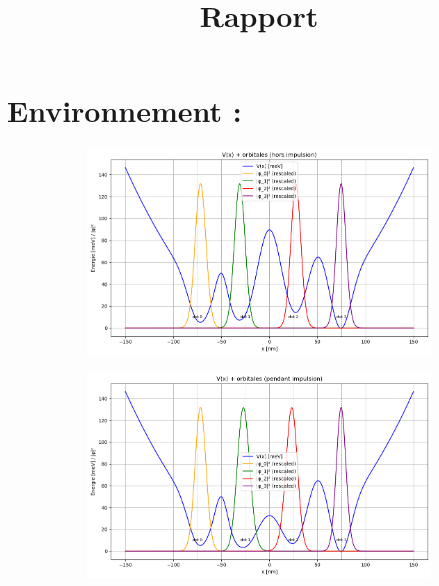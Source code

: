 \documentclass{article}
\title{Rapport}
\begin{document}
\maketitle

\section*{Environnement :}

\begin{figure}[H]
  \centering
  \begin{subfigure}[c]{0.48\textwidth}
    \centering
    \includegraphics[width=\textwidth]{hors_impulsion_bon.png}
    \label{fig:view_1D_off}
  \end{subfigure}\hfill
  \begin{subfigure}[c]{0.48\textwidth}
    \centering
    \includegraphics[width=\textwidth]{pdt_impulsion_bon.png}
    \label{fig:view_1D_on}
  \end{subfigure}
\end{figure}
\end{document}
